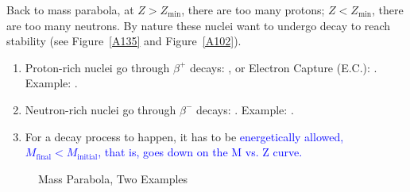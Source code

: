 \documentclass{school-22.101-notes}
\begin{document}
Back to mass parabola, at $Z > Z_{\mathrm{min}}$, there are too many protons; $Z < Z_{\mathrm{min}}$, there are too many neutrons. By nature these nuclei want to undergo decay to reach stability (see Figure~\ref{A135} and Figure~\ref{A102}). 
\begin{enumerate}
\item Proton-rich nuclei go through $\beta^+$ decays: , or Electron Capture (E.C.): . Example: . 
\item Neutron-rich nuclei go through $\beta^-$ decays: . Example: .
\item For a decay process to happen, it has to be \textcolor{blue}{energetically allowed, $M_{\mathrm{final}} < M_{\mathrm{initial}}$, that is, goes down on the M vs. Z curve.}
\end{enumerate}
\begin{figure}
  \centering
  \caption{Mass Parabola, Two Examples}
\end{figure}
\end{document}
